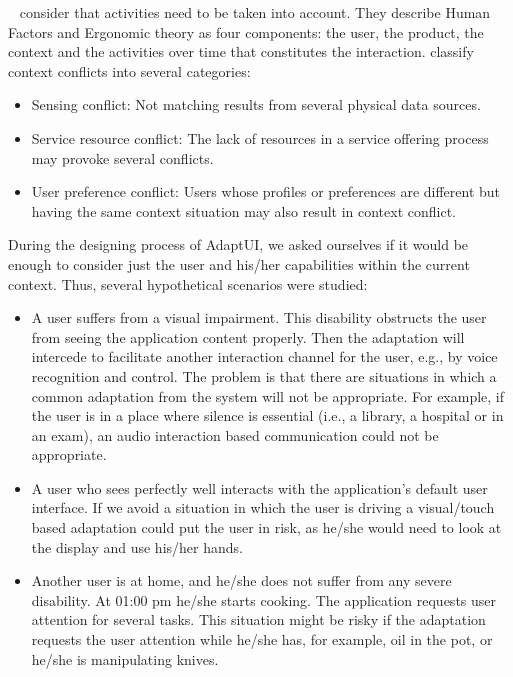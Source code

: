 \citet{persad_characterising_2007}~\citep{persad_cognitive_2007}
consider that activities need to be taken into account. They describe Human
Factors and Ergonomic theory as four components: the user, the product, the context
and the activities over time that constitutes the interaction.
\citet{hong_context_aware_2009} classify context conflicts into several categories:

\begin{itemize}
 \item Sensing conflict: Not matching results from several physical data sources.
 
 \item Service resource conflict: The lack of resources in a service offering
 process may provoke several conflicts.
 
 \item User preference conflict: Users whose profiles or preferences are different
 but having the same context situation may also result in context conflict.
\end{itemize}

During the designing process of AdaptUI, we asked ourselves if it would be enough
to consider just the user and his/her capabilities within the current context.
Thus, several hypothetical scenarios were studied:

\begin{itemize}
 \item A user suffers from a visual impairment. This disability obstructs
 the user from seeing the application content properly. Then the adaptation
 will intercede to facilitate another interaction channel for the user, e.g.,
 by voice recognition and control. The problem is that there are situations
 in which a common adaptation from the system will not be appropriate.
 For example, if the user is in a place where silence is essential (i.e., a
 library, a hospital or in an exam), an audio interaction based communication
 could not be appropriate. 
 
 \item A user who sees perfectly well interacts with the application’s
 default user interface. If we avoid a situation in which the user is driving
 a visual/touch based adaptation could put the user in risk, as he/she would
 need to look at the display and use his/her hands.
 
 \item Another user is at home, and he/she does not suffer from any severe
 disability. At 01:00 pm he/she starts cooking. The application requests
 user attention for several tasks. This situation might be risky if the adaptation
 requests the user attention while he/she has, for example, oil in the pot, or
 he/she is manipulating knives.
\end{itemize}

